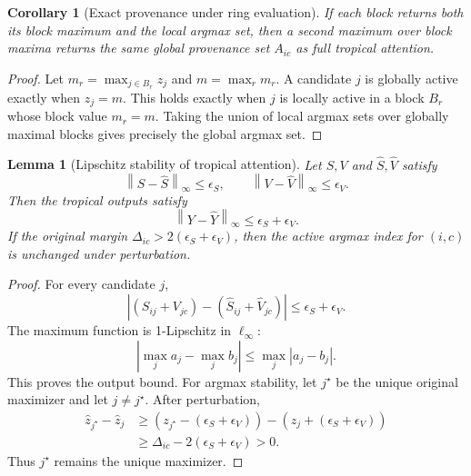 \documentclass[11pt]{article}
\theoremstyle{definition}
\theoremstyle{plain}
\newtheorem{lemma}[definition]{Lemma}
\newtheorem{corollary}[definition]{Corollary}
\theoremstyle{remark}
\numberwithin{equation}{section}
\newcommand{\norm}[1]{\left\lVert #1\right\rVert}
\newcommand{\abs}[1]{\left\lvert #1\right\rvert}
\begin{document}
\begin{corollary}[Exact provenance under ring evaluation]
If each block returns both its block maximum and the local argmax set, then a second maximum over block maxima returns the same global provenance set $A_{ic}$ as full tropical attention.
\end{corollary}

\begin{proof}
Let $m_r=\max_{j\in B_r}z_j$ and $m=\max_r m_r$.  A candidate $j$ is globally active exactly when $z_j=m$.  This holds exactly when $j$ is locally active in a block $B_r$ whose block value $m_r=m$.  Taking the union of local argmax sets over globally maximal blocks gives precisely the global argmax set.
\end{proof}

\begin{lemma}[Lipschitz stability of tropical attention]
Let $S,V$ and $\widehat S,\widehat V$ satisfy
\begin{equation}
  \norm{S-\widehat S}_{\infty}\le\epsilon_S,
  \qquad \norm{V-\widehat V}_{\infty}\le\epsilon_V.
\end{equation}
Then the tropical outputs satisfy
\begin{equation}
  \norm{Y-\widehat Y}_{\infty}\le \epsilon_S+\epsilon_V.
\end{equation}
If the original margin $\Delta_{ic}>2(\epsilon_S+\epsilon_V)$, then the active argmax index for $(i,c)$ is unchanged under perturbation.
\end{lemma}

\begin{proof}
For every candidate $j$,
\begin{equation}
  \abs{(S_{ij}+V_{jc})-(\widehat S_{ij}+\widehat V_{jc})}\le\epsilon_S+
\epsilon_V.
\end{equation}
The maximum function is 1-Lipschitz in $\ell_\infty$:
\begin{equation}
  \abs{\max_j a_j-\max_j b_j}\le\max_j\abs{a_j-b_j}.
\end{equation}
This proves the output bound.  For argmax stability, let $j^\star$ be the unique original maximizer and let $j\ne j^\star$.  After perturbation,
\begin{align}
  \widehat z_{j^\star}-\widehat z_j
  &\ge (z_{j^\star}-(\epsilon_S+\epsilon_V))-(z_j+(\epsilon_S+\epsilon_V))\\
  &\ge \Delta_{ic}-2(\epsilon_S+\epsilon_V)>0.
\end{align}
Thus $j^\star$ remains the unique maximizer.
\end{proof}
\end{document}
